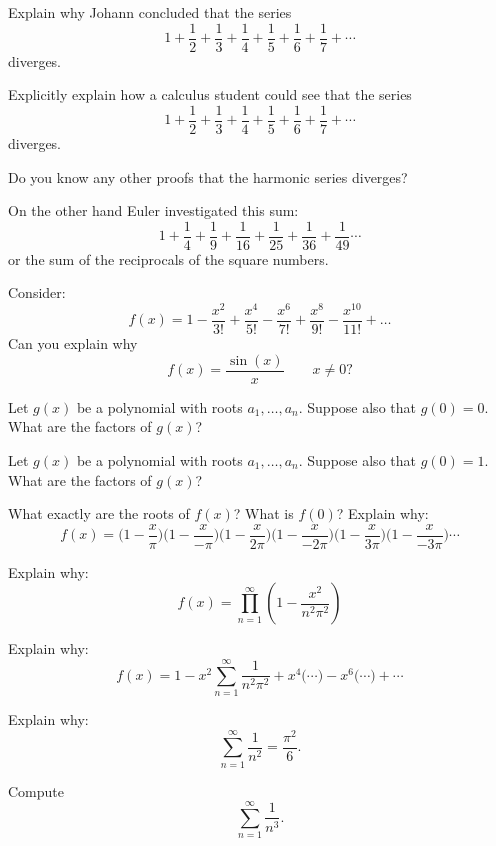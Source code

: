 \documentclass{ximera}
\begin{document}
\begin{question}
Explain why Johann concluded that the series
\[
1 + \frac{1}{2} + \frac{1}{3} + \frac{1}{4} + \frac{1}{5} + \frac{1}{6} + \frac{1}{7}+\cdots
\]
diverges. 
\end{question}


\begin{question}
Explicitly explain how a calculus student could see that the series
\[
1 + \frac{1}{2} + \frac{1}{3} + \frac{1}{4} + \frac{1}{5} + \frac{1}{6} + \frac{1}{7}+\cdots
\]
diverges.
\end{question}

\begin{question}
Do you know any other proofs that the harmonic series diverges?
\end{question}


On the other hand Euler investigated this sum:
\[
1 + \frac{1}{4} + \frac{1}{9} + \frac{1}{16} + \frac{1}{25} + \frac{1}{36} + \frac{1}{49}\cdots
\]
or the sum of the reciprocals of the square numbers. 


\begin{question}
Consider:
\[
f(x) = 1 - \frac{x^2}{3!} + \frac{x^4}{5!}-\frac{x^6}{7!} + \frac{x^8}{9!} - \frac{x^{10}}{11!} + \dots
\]
Can you explain why 
\[
f(x) = \frac{\sin(x)}{x}\qquad x \ne 0?
\]
\end{question}


\begin{question}
Let $g(x)$ be a polynomial with roots $a_1,\dots, a_n$. Suppose also
that $g(0)=0$. What are the factors of $g(x)$?
\end{question}

\begin{question}
Let $g(x)$ be a polynomial with roots $a_1,\dots, a_n$. Suppose also
that $g(0)=1$. What are the factors of $g(x)$?
\end{question}

\begin{question}
What exactly are the roots of $f(x)$? What is $f(0)$?  Explain why:
\[
f(x) = \bigg(1-\frac{x}{\pi} \bigg)\bigg(1-\frac{x}{-\pi} \bigg)\bigg(1-\frac{x}{2\pi} \bigg)\bigg(1-\frac{x}{-2\pi} \bigg)\bigg(1-\frac{x}{3\pi} \bigg)\bigg(1-\frac{x}{-3\pi} \bigg) \cdots
\]
\end{question}

\begin{question}
Explain why:
\[
f(x) = \prod_{n=1}^\infty \left(1 - \frac{x^2}{n^2\pi^2} \right)
\]
\end{question}

\begin{question}
Explain why:
\[
f(x) = 1 - x^2 \sum_{n=1}^\infty \frac{1}{n^2\pi^2} 
+ x^4 \bigg(\cdots\bigg)  - x^6 \bigg(\cdots\bigg)  + \cdots
\]
\end{question}


\begin{question}
Explain why:
\[
\sum_{n=1}^\infty \frac{1}{n^2}= \frac{\pi^2}{6}.
\]
\end{question}

\begin{exploration}[Bonus!]
Compute
\[
\sum_{n=1}^\infty \frac{1}{n^3}.
\]
\end{exploration}
\end{document}
